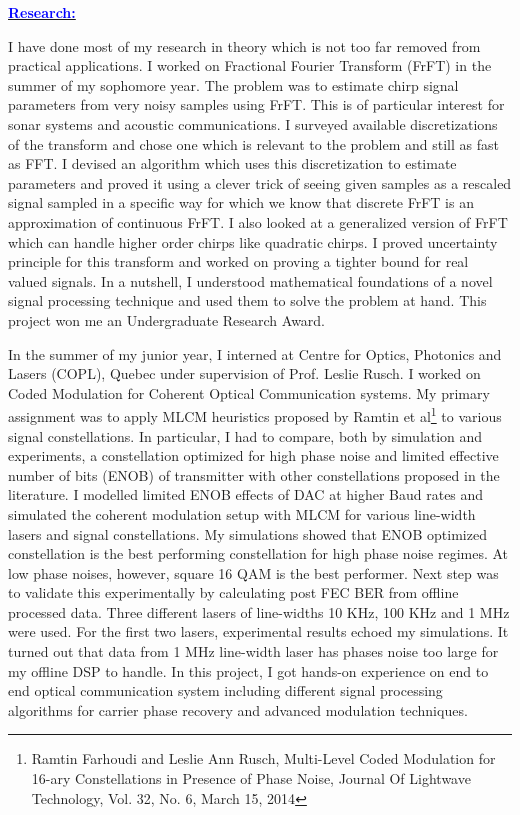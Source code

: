 \documentclass[11pt]{article}
\newcommand{\statement}[1]{\par\medskip
  \underline{\textcolor{blue}{\textbf{#1:}}}\space
}
\begin{document}
\statement{Research}
I have done most of my research in theory which is not too far removed from practical applications. 
I worked on Fractional Fourier Transform (FrFT) in the summer of my sophomore year.
The problem was to estimate chirp signal parameters from very noisy samples using FrFT. This is of particular interest for sonar systems and acoustic communications. 
I surveyed available discretizations of the transform and chose one which is relevant to the problem and still as fast as FFT. 
I devised an algorithm which uses this discretization to estimate parameters and proved it using a clever trick of seeing given samples as a rescaled signal sampled in a specific way for which we know that discrete FrFT is an approximation of continuous FrFT. 
I also looked at a generalized version of FrFT which can handle higher order chirps like quadratic chirps. 
I proved uncertainty principle for this transform and worked on proving a tighter bound for real valued signals. 
In a nutshell, I understood mathematical foundations of a novel signal processing technique and used them to solve the problem at hand. This project won me an Undergraduate Research Award.

In the summer of my junior year, I interned at Centre for Optics, Photonics and Lasers (COPL), Quebec under supervision of Prof. Leslie Rusch. I worked on Coded Modulation for Coherent Optical Communication systems. 
My primary assignment was to apply MLCM heuristics proposed by Ramtin et al\footnote{ Ramtin Farhoudi and Leslie Ann Rusch, Multi-Level Coded Modulation for 16-ary Constellations in Presence of Phase Noise, Journal Of Lightwave Technology, Vol. 32, No. 6, March 15, 2014}
to various signal constellations. 
In particular, I had to compare, both by simulation and experiments, a constellation optimized for high phase noise and limited effective number of bits (ENOB) of transmitter with other constellations proposed in the literature. 
I modelled limited ENOB effects of DAC at higher Baud rates and simulated the coherent modulation setup with MLCM for various line-width lasers and signal constellations.
 My simulations showed that ENOB optimized constellation is the best performing constellation for high phase noise regimes. 
At low phase noises, however, square 16 QAM is the best performer. Next step was to validate this experimentally by calculating post FEC BER from offline processed data. 
Three different lasers of line-widths 10 KHz, 100 KHz and 1 MHz were used. For the first two lasers, experimental results echoed my simulations. 
It turned out that data from 1 MHz line-width laser has phases noise too large for my offline DSP to handle. 
In this project, I got hands-on experience on end to end optical communication system including different signal processing algorithms for carrier phase recovery and advanced modulation techniques.
\end{document}
